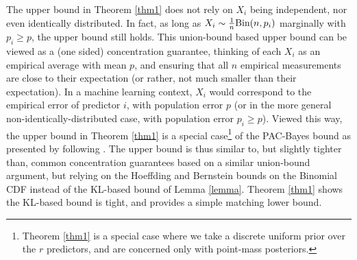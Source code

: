\documentclass[12pt]{article}
\newcommand{\KL}{\textsf{KL}}
\begin{document}
\begin{remark}
The upper bound in Theorem \ref{thm1} does not rely on $X_i$ being independent, nor even identically distributed. In fact, as long as $X_i \sim \frac{1}{n}\textnormal{Bin}(n, p_i)$ marginally with $p_i \geq p$, the upper bound still holds.  This union-bound based upper bound can be viewed as a (one sided) concentration guarantee, thinking of each $X_i$ as an empirical average with mean $p$, and ensuring that all $n$ empirical measurements are close to their expectation (or rather, not much smaller than their expectation).  In a machine learning context, $X_i$ would correspond to the empirical error of predictor $i$, with population error $p$ (or in the more general non-identically-distributed case, with population error $p_i\geq p$).  Viewed this way, the upper bound in Theorem \ref{thm1} is a special case\footnote{Theorem \ref{thm1} is a special case where we take a discrete uniform prior over the $r$ predictors, and are concerned only with point-mass posteriors.} of the PAC-Bayes bound as presented by \citet[][Equation (4)]{mcallester2003simplified} following \citet{langford2001bounds}.  The upper bound is thus similar to, but slightly tighter than, common concentration guarantees based on a similar union-bound argument, but relying on the Hoeffding and Bernstein bounds on the Binomial CDF instead of the KL-based bound of Lemma \ref{lemma}.  Theorem \ref{thm1} shows the KL-based bound is tight, and provides a simple matching lower bound.

    

\end{remark}



%   
%   



\end{document}
